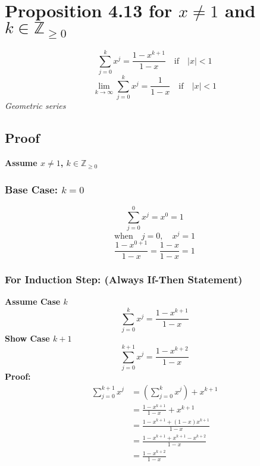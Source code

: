\documentclass{article}
\begin{document}
\section*{Proposition 4.13 for $x \neq 1$ and $k \in \mathbb{Z}_{\geq 0}$}
\[
\sum_{j=0}^{k} x^j = \frac{1 - x^{k+1}}{1 - x} \quad \text{if} \quad |x| < 1
\]
\[
\lim_{k \to \infty} \sum_{j=0}^{k} x^j = \frac{1}{1 - x} \quad \text{if} \quad |x| < 1
\]
\textit{Geometric series}

\subsection*{Proof}
\textbf{Assume $x \neq 1$, $k \in \mathbb{Z}_{\geq 0}$}

\subsubsection*{Base Case: $k = 0$}
\[
\sum_{j=0}^{0} x^j = x^0 = 1
\]
\[
\text{when} \quad j=0, \quad x^j = 1
\]
\[
\frac{1 - x^{0+1}}{1 - x} = \frac{1 - x}{1 - x} = 1
\]

\subsubsection*{For Induction Step: (Always If-Then Statement)}
\textbf{Assume Case $k$}
\[
\sum_{j=0}^{k} x^j = \frac{1 - x^{k+1}}{1 - x}
\]
\textbf{Show Case $k+1$}
\[
\sum_{j=0}^{k+1} x^j = \frac{1 - x^{k+2}}{1 - x}
\]
\textbf{Proof:}
\[
\begin{aligned}
\sum_{j=0}^{k+1} x^j &= \left( \sum_{j=0}^{k} x^j \right) + x^{k+1} \\
&= \frac{1 - x^{k+1}}{1 - x} + x^{k+1} \\
&= \frac{1 - x^{k+1} + (1 - x) x^{k+1}}{1 - x} \\
&= \frac{1 - x^{k+1} + x^{k+1} - x^{k+2}}{1 - x} \\
&= \frac{1 - x^{k+2}}{1 - x}
\end{aligned}
\]
\end{document}

